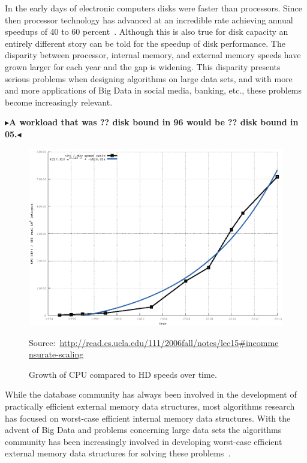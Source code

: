 \documentclass[twoside,11pt,openright]{report}
\newcommand{\todo}[1]{{\color[rgb]{.5,0,0}\textbf{$\blacktriangleright$#1$\blacktriangleleft$}}}
\begin{document}
In the early days of electronic computers disks were faster than processors. Since then processor technology has advanced at an incredible rate achieving annual speedups of 40 to 60 percent~\cite{ruemmler_wilkes_1994}. Although this is also true for disk capacity an entirely different story can be told for the speedup of disk performance. The disparity between processor, internal memory, and external memory speeds have grown larger for each year and the gap is widening. This disparity presents serious problems when designing algorithms on large data sets, and with more and more applications of Big Data in social media, banking, etc., these problems become increasingly relevant.

\todo{A workload that was ?? disk bound in 96 would be ?? disk bound in 05.}
\begin{figure}[h]
	\centering
		\includegraphics[width=\textwidth]{../plots/scaling_discrepancy_hdd_cpu/scaling_discrepancy_hdd_cpu}
	\caption{Growth of CPU compared to HD speeds over time.}
	\tiny{Source:~\protect\url{http://read.cs.ucla.edu/111/2006fall/notes/lec15\#incommensurate-scaling}}
	\label{fig:cpu_vs_disk}
\end{figure}

While the database community has always been involved in the development of practically efficient external memory data structures, most algorithms research has focused on worst-case efficient internal memory data structures. With the advent of Big Data and problems concerning large data sets the algorithms community has been increasingly involved in developing worst-case efficient external memory data structures for solving these problems~\cite{ionote}.
\end{document}
